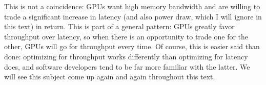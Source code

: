 This is not a coincidence: GPUs want high memory bandwidth and are willing to trade a significant
increase in latency (and also power draw, which I will ignore in this text) in return. This is part
of a general pattern: GPUs greatly favor throughput over latency, so when there is an opportunity to
trade one for the other, GPUs will go for throughput every time. Of course, this is easier said than
done: optimizing for throughput works differently than optimizing for latency does, and software
developers tend to be far more familiar with the latter. We will see this subject come up again and again
throughout this text.

{}
